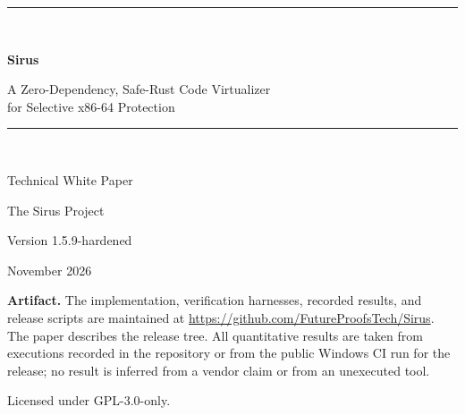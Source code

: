 \documentclass[11pt,a4paper]{article}
\newcommand{\code}[1]{\texttt{\detokenize{#1}}}
\begin{document}
\begin{titlepage}
\centering
\vspace*{1.2in}
{\color{sirusblue}\rule{\textwidth}{1.2pt}}\\[0.5em]
{\Huge\bfseries Sirus\par}
\vspace{0.35em}
{\LARGE A Zero-Dependency, Safe-Rust Code Virtualizer\\[0.2em]
for Selective x86-64 Protection\par}
\vspace{0.5em}
{\color{sirusblue}\rule{\textwidth}{1.2pt}}\\[1.5em]
{\large Technical White Paper\par}
\vspace{1.2em}
{\large The Sirus Project\par}
\vspace{0.4em}
{\large Version 1.5.9-hardened\par}
\vspace{0.4em}
{\large November 2026\par}
\vfill
\begin{minipage}{0.82\textwidth}
\small
\textbf{Artifact.} The implementation, verification harnesses, recorded results, and
release scripts are maintained at
\url{https://github.com/FutureProofsTech/Sirus}. The paper describes the
\code{1.5.9-hardened} release tree. All quantitative results are taken from
executions recorded in the repository or from the public Windows CI run for the
release; no result is inferred from a vendor claim or from an unexecuted tool.
\end{minipage}
\vspace{1.0em}

{\small Licensed under GPL-3.0-only.}
\end{titlepage}
\end{document}
